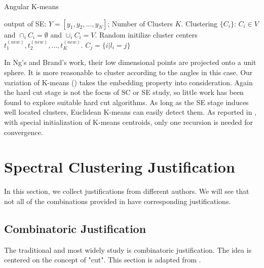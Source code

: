 \begin{algorithm}[htb]
	\caption{Angular K-means}
	\label{alg:sc_akm}
	\begin{algorithmic}[1]
		\REQUIRE output of SE: $Y = [y_1, y_2, \ldots, y_N]$;  
		Number of Clusters $K$. 
		\ENSURE Clustering $\{C_i\}$: $C_i \in V$ 
			and $\cap_i C_i = \emptyset$
			and $\cup_i C_i = V$. 
		\STATE Random initilize cluster centers $t^{(new)}_1, t^{(new)}_2, \dots, t^{(new)}_K$.
		\STATE $C_j = \{i| l_i = j\}$
	\end{algorithmic}
\end{algorithm}

In Ng's \cite{ng2002spectral} and Brand's \cite{brand2003unifying} work, 
their low dimensional points are projected onto a unit sphere. It is more 
reasonable to cluster according to the angles
in this case. Our variation of K-means
(\ralg{\ref{alg:sc_akm}}) takes the embedding property into consideration. 
Again the hard cut stage is not the focus of SC or SE study, so 
little work has been found to explore suitable hard cut algorithms. 
As long as the SE stage induces well located clusters, Euclidean 
K-means can easily detect them. As reported in \cite{ng2002spectral}, 
with special initialization of K-means centroids, only one recursion 
is needed for convergence. 

\section{Spectral Clustering Justification}
\label{sec:justification}

In this section, we collect justifications from different authors. 
We will see that not all of the combinations provided in 
\rsec{\ref{sec:framework}} have corresponding justifications. 

\subsection{Combinatoric Justification}
\label{sec:combinatoric}

The traditional and most widely study is combinatoric justification. 
The idea is centered on the concept of "cut". This section is 
adapted from 
\cite{shi2000normalized}
\cite{von2007tutorial}
\cite{dhillon2004unified}. 

